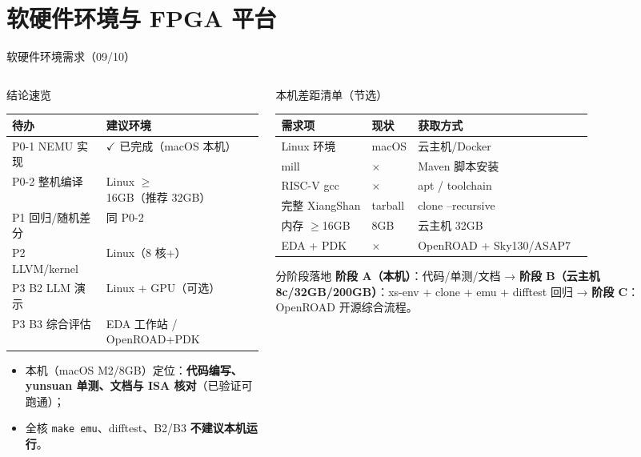 \documentclass[aspectratio=169]{beamer}
\newcommand{\smalltable}[1]{\par\centering\scriptsize #1\par}
\begin{document}
\section{软硬件环境与 FPGA 平台}

\begin{frame}{软硬件环境需求（09/10）}
\begin{columns}[T]
\begin{column}{0.5\textwidth}
\begin{block}{结论速览}
\smalltable{%
\begin{tabular}{@{}ll@{}}
\toprule
待办 & 建议环境 \\
\midrule
P0-1 NEMU 实现 & $\checkmark$ 已完成（macOS 本机）\\
P0-2 整机编译 & Linux $\ge$16GB（推荐 32GB）\\
P1 回归/随机差分 & 同 P0-2 \\
P2 LLVM/kernel & Linux（8 核+）\\
P3 B2 LLM 演示 & Linux + GPU（可选）\\
P3 B3 综合评估 & EDA 工作站 / OpenROAD+PDK \\
\bottomrule
\end{tabular}}
\end{block}
\begin{itemize}
  \item 本机（macOS M2/8GB）定位：\textbf{代码编写、yunsuan 单测、文档与 ISA 核对}（已验证可跑通）；
  \item 全核 \texttt{make emu}、difftest、B2/B3 \textbf{不建议本机运行}。
\end{itemize}
\end{column}
\begin{column}{0.48\textwidth}
\begin{block}{本机差距清单（节选）}
\smalltable{%
\begin{tabular}{@{}llll@{}}
\toprule
需求项 & 现状 & 获取方式 \\
\midrule
Linux 环境 & macOS & 云主机/Docker \\
mill & $\times$ & Maven 脚本安装 \\
RISC-V gcc & $\times$ & apt / toolchain \\
完整 XiangShan & tarball & clone --recursive \\
内存 $\ge$16GB & 8GB & 云主机 32GB \\
EDA + PDK & $\times$ & OpenROAD + Sky130/ASAP7 \\
\bottomrule
\end{tabular}}
\end{block}
\begin{block}{分阶段落地}
\textbf{阶段 A（本机）}：代码/单测/文档 → \textbf{阶段 B（云主机 8c/32GB/200GB）}：xs-env + clone + emu + difftest 回归 → \textbf{阶段 C}：OpenROAD 开源综合流程。
\end{block}
\end{column}
\end{columns}
\end{frame}
\end{document}
